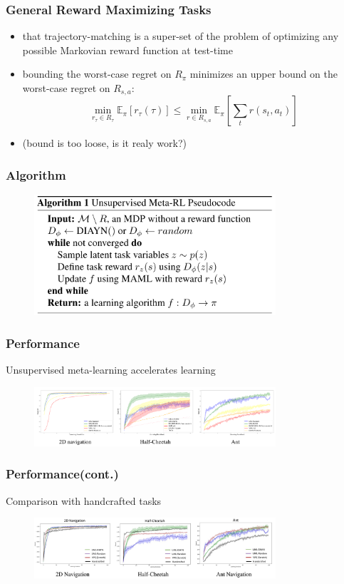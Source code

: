 \documentclass[aspectratio=169]{beamer}
\begin{document}
\begin{frame}
  \frametitle{General Reward Maximizing Tasks}
  \begin{itemize}
    \item that trajectory-matching is a super-set of the problem of optimizing any possible Markovian reward function at test-time
    \item bounding the worst-case regret on $R_\pi$ minimizes an upper bound on the worst-case regret on $R_{s,a}$: $$\min _{r_{\tau} \in R_{\tau}} \mathbb{E}_{\pi}\left[r_{\tau}(\tau)\right] \leq \min _{r \in R_{s, a}} \mathbb{E}_{\pi}\left[\sum_{t} r\left(s_{t}, a_{t}\right)\right]$$
    \item (bound is too loose, is it realy work?)
  \end{itemize}
\end{frame}

\begin{frame}
  \frametitle{Algorithm}
  \begin{figure}
    \centering
    \includegraphics[width=0.8\textwidth]{imgs/agorithm.png}
  \end{figure}
\end{frame}

\begin{frame}
  \frametitle{Performance}
  Unsupervised meta-learning accelerates learning
  \begin{figure}
    \centering
    \includegraphics[width=0.8\textwidth]{imgs/performance1.png}
  \end{figure}
\end{frame}


  \begin{frame}
    \frametitle{Performance(cont.)}
    Comparison with handcrafted tasks
    \begin{figure}
      \centering
      \includegraphics[width=0.8\textwidth]{imgs/performance2.png}
    \end{figure}
\end{frame}
\end{document}
